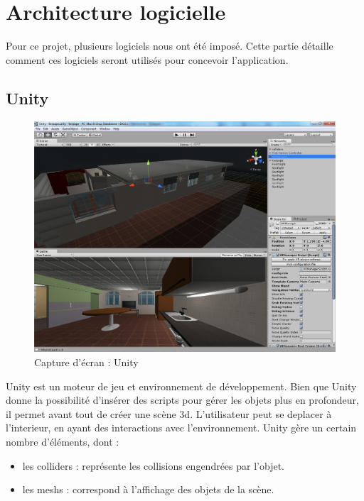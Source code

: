 \section{Architecture logicielle}
Pour ce projet, plusieurs logiciels nous ont été imposé. Cette partie détaille comment ces logiciels seront utilisés pour concevoir l'application.

\subsection{Unity}
\begin{figure}
  \includegraphics[scale=0.13]{4-conception/img/unity_screenshot.png}
  \caption{Capture d'écran : Unity}
  \label{unity}
\end{figure}

Unity est un moteur de jeu et environnement de développement. Bien que Unity donne la possibilité d'insérer des scripts pour gérer les objets plus en profondeur, il permet avant tout de créer une scène 3d. L'utilisateur peut se deplacer à l'interieur, en ayant des interactions avec l'environnement. Unity gère un certain nombre d'éléments, dont :
\begin{itemize}
        \item les colliders : représente les collisions engendrées par l'objet.
        \item les meshs : correspond à l'affichage des objets de la scène.
\end{itemize}



